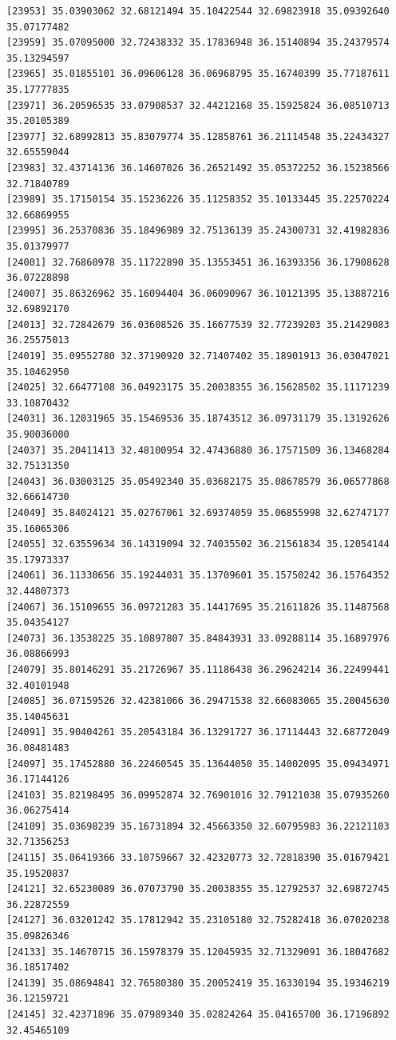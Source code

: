 \documentclass[
  letterpaper,
  DIV=11,
  numbers=noendperiod]{scrartcl}
\begin{document}
\begin{verbatim}
[23953] 35.03903062 32.68121494 35.10422544 32.69823918 35.09392640 35.07177482
[23959] 35.07095000 32.72438332 35.17836948 36.15140894 35.24379574 35.13294597
[23965] 35.01855101 36.09606128 36.06968795 35.16740399 35.77187611 35.17777835
[23971] 36.20596535 33.07908537 32.44212168 35.15925824 36.08510713 35.20105389
[23977] 32.68992813 35.83079774 35.12858761 36.21114548 35.22434327 32.65559044
[23983] 32.43714136 36.14607026 36.26521492 35.05372252 36.15238566 32.71840789
[23989] 35.17150154 35.15236226 35.11258352 35.10133445 35.22570224 32.66869955
[23995] 36.25370836 35.18496989 32.75136139 35.24300731 32.41982836 35.01379977
[24001] 32.76860978 35.11722890 35.13553451 36.16393356 36.17908628 36.07228898
[24007] 35.86326962 35.16094404 36.06090967 36.10121395 35.13887216 32.69892170
[24013] 32.72842679 36.03608526 35.16677539 32.77239203 35.21429083 36.25575013
[24019] 35.09552780 32.37190920 32.71407402 35.18901913 36.03047021 35.10462950
[24025] 32.66477108 36.04923175 35.20038355 36.15628502 35.11171239 33.10870432
[24031] 36.12031965 35.15469536 35.18743512 36.09731179 35.13192626 35.90036000
[24037] 35.20411413 32.48100954 32.47436880 36.17571509 36.13468284 32.75131350
[24043] 36.03003125 35.05492340 35.03682175 35.08678579 36.06577868 32.66614730
[24049] 35.84024121 35.02767061 32.69374059 35.06855998 32.62747177 35.16065306
[24055] 32.63559634 36.14319094 32.74035502 36.21561834 35.12054144 35.17973337
[24061] 36.11330656 35.19244031 35.13709601 35.15750242 36.15764352 32.44807373
[24067] 36.15109655 36.09721283 35.14417695 35.21611826 35.11487568 35.04354127
[24073] 36.13538225 35.10897807 35.84843931 33.09288114 35.16897976 36.08866993
[24079] 35.80146291 35.21726967 35.11186438 36.29624214 36.22499441 32.40101948
[24085] 36.07159526 32.42381066 36.29471538 32.66083065 35.20045630 35.14045631
[24091] 35.90404261 35.20543184 36.13291727 36.17114443 32.68772049 36.08481483
[24097] 35.17452880 36.22460545 35.13644050 35.14002095 35.09434971 36.17144126
[24103] 35.82198495 36.09952874 32.76901016 32.79121038 35.07935260 36.06275414
[24109] 35.03698239 35.16731894 32.45663350 32.60795983 36.22121103 32.71356253
[24115] 35.06419366 33.10759667 32.42320773 32.72818390 35.01679421 35.19520837
[24121] 32.65230089 36.07073790 35.20038355 35.12792537 32.69872745 36.22872559
[24127] 36.03201242 35.17812942 35.23105180 32.75282418 36.07020238 35.09826346
[24133] 35.14670715 36.15978379 35.12045935 32.71329091 36.18047682 36.18517402
[24139] 35.08694841 32.76580380 35.20052419 35.16330194 35.19346219 36.12159721
[24145] 32.42371896 35.07989340 35.02824264 35.04165700 36.17196892 32.45465109

\end{verbatim}
\end{document}
